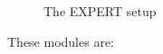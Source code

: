 \documentclass{webofc}
\begin{document}
\begin{figure}[h]
	\caption{The EXPERT setup}
	\label{IMris:expert}
\end{figure}

These modules are:
\end{document}
